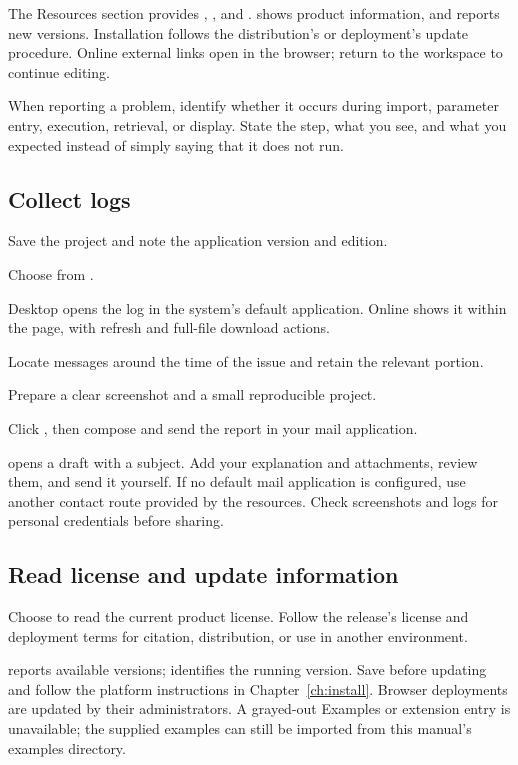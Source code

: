 The Resources section provides , , and .  shows product information, and  reports new versions. Installation follows the distribution's or deployment's update procedure. Online external links open in the browser; return to the workspace to continue editing.

When reporting a problem, identify whether it occurs during import, parameter entry, execution, retrieval, or display. State the step, what you see, and what you expected instead of simply saying that it does not run.

\subsection{Collect logs}

\begin{steps}
\item Save the project and note the application version and edition.
\item Choose  from .
\item Desktop opens the log in the system's default application. Online shows it within the page, with refresh and full-file download actions.
\item Locate messages around the time of the issue and retain the relevant portion.
\item Prepare a clear screenshot and a small reproducible project.
\item Click , then compose and send the report in your mail application.
\end{steps}

 opens a draft with a subject. Add your explanation and attachments, review them, and send it yourself. If no default mail application is configured, use another contact route provided by the resources. Check screenshots and logs for personal credentials before sharing.

\subsection{Read license and update information}

Choose  to read the current product license. Follow the release's license and deployment terms for citation, distribution, or use in another environment.

 reports available versions;  identifies the running version. Save before updating and follow the platform instructions in Chapter~\ref{ch:install}. Browser deployments are updated by their administrators. A grayed-out Examples or extension entry is unavailable; the supplied examples can still be imported from this manual's examples directory.


